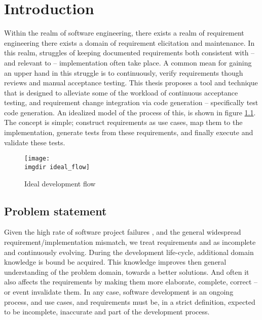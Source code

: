 \chapter{Introduction}


Within the realm of software engineering, there exists a realm of requirement engineering there exists a domain of requirement elicitation and maintenance. In this realm, struggles of keeping documented requirements both consistent with -- and relevant to -- implementation often take place. A common mean for gaining an upper hand in this struggle is to continuously, verify requirements though reviews and manual acceptance testing. This thesis proposes a tool and technique that is designed to alleviate some of the workload of continuous acceptance testing, and requirement change integration via code generation -- specifically test code generation. An idealized model of the process of this, is shown in figure \ref{fig:ideal_flow}. The concept is simple; construct requirements as use cases, map them to the implementation, generate tests from these requirements, and finally execute and validate these tests.
\begin{figure}[!htbp]
\centering
\texttt{[image: \\imgdir ideal\_flow]}
\caption{Ideal development flow}
\label{fig:ideal_flow}
\end{figure}
\section{Problem statement}
Given the high rate of software project failures\cite{verner2008} \cite{charette2005}, and the general widespread requirement/implementation mismatch, we treat requirements and as incomplete and continuously evolving.
During the development life-cycle, additional domain knowledge is bound be acquired. This knowledge improves then general understanding of the problem domain, towards a better solutions. And often it also affects the requirements by making them more elaborate, complete, correct -- or event invalidate them. In any case, software development is an ongoing process, and use cases, and requirements must be, in a strict definition, expected to be incomplete, inaccurate and part of the development process.\bigskip

